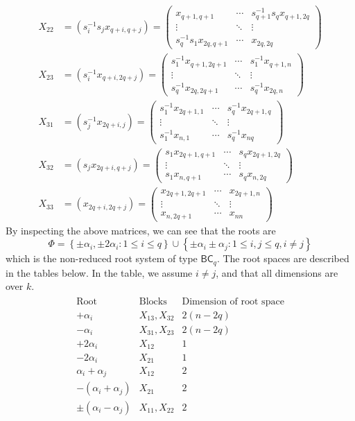 \documentclass[12pt]{article}
\theoremstyle{definition}
\numberwithin{theorem}{subsection}
\newcommand{\lp}{\left(}
\newcommand{\rp}{\right)}
\newcommand{\lb}{\left\{}
\newcommand{\rb}{\right\}}
\newcommand{\inv}{^{-1}}
\begin{document}
\begin{align*}
	X_{22} &= \lp s_{i} \inv s_{j} x_{q+i,q+j} \rp =
	\begin{pmatrix}
	 	x_{q+1, q+1} & \cdots & s_{q+1} \inv s_{q} x_{q+1, 2q} \\
	 	\vdots & \ddots & \vdots \\
	 	s_{q} \inv s_{1} x_{2q, q+1} & \cdots & x_{2q, 2q}
	\end{pmatrix} \\
	X_{23} &= \lp s_{i} \inv x_{q+i, 2q+j} \rp = 
	\begin{pmatrix}
		s_{1} \inv x_{q+1, 2q+1} & \cdots & s_{1} \inv x_{q+1, n} \\
		\vdots & \ddots & \vdots \\
		s_{q} \inv x_{2q, 2q+1} & \cdots & s_{q} \inv x_{2q, n}
	\end{pmatrix} \\
	X_{31} &= \lp s_j \inv x_{2q+i, j} \rp = 
	\begin{pmatrix}
		s_1 \inv x_{2q+1, 1} & \cdots & s_q \inv x_{2q+1, q} \\
		\vdots & \ddots & \vdots \\
		s_1 \inv x_{n, 1} & \cdots & s_q \inv x_{nq}
	\end{pmatrix} \\
	X_{32} &= \lp s_j x_{2q+i, q+j} \rp = 
	\begin{pmatrix}
		s_1 x_{2q+1, q+1} & \cdots & s_q x_{2q+1, 2q} \\
		\vdots & \ddots & \vdots \\
		s_1 x_{n,q+1} & \cdots & s_q x_{n, 2q}
	\end{pmatrix} \\
	X_{33} &=\lp x_{2q+i, 2q+j} \rp = 
	\begin{pmatrix}
		x_{2q+1, 2q+1} & \cdots & x_{2q+1, n}\\
		\vdots & \ddots & \vdots \\
		x_{n, 2q+1} & \cdots & x_{nn}
	\end{pmatrix}
\end{align*}
By inspecting the above matrices, we can see that the roots are
\[
	\Phi = \lb \pm \alpha_i, \pm 2 \alpha_i : 1 \le i \le q \rb \cup \lb \pm \alpha_i \pm \alpha_j : 1 \le i, j \le q, i \neq j \rb
\]
which is the non-reduced root system of type $\mathsf{BC}_q$. The root spaces are described in the tables below. In the table, we assume $i \neq j$, and that all dimensions are over $k$.
\begin{align*}
	\begin{array}{c|c|c}
		\text{Root} & \text{Blocks} & \text{Dimension of root space}  \\
		\hline
		+\alpha_i &  X_{13}, X_{32} & 2(n-2q)  \\
		- \alpha_i & X_{31}, X_{23} & 2(n-2q) \\
		+2\alpha_i & X_{12} & 1 \\
		-2 \alpha_i & X_{21} & 1 \\
		\alpha_i + \alpha_j & X_{12} & 2 \\
		-(\alpha_i + \alpha_j) & X_{21} & 2 \\
		\pm (\alpha_i - \alpha_j) & X_{11}, X_{22} & 2
	\end{array}
\end{align*}
\end{document}
